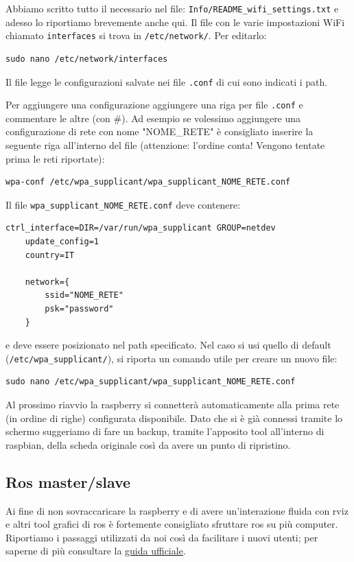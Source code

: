 Abbiamo scritto tutto il necessario nel file: \texttt{Info/README\_wifi\_settings.txt} e adesso lo riportiamo brevemente anche qui.
Il file con le varie impostazioni WiFi chiamato \texttt{interfaces} si trova in \texttt{/etc/network/}. Per editarlo:
\begin{lstlisting}[style=bash]
	sudo nano /etc/network/interfaces
\end{lstlisting}
Il file legge le configurazioni salvate nei file \texttt{.conf} di cui sono indicati i path. 

Per aggiungere una configurazione aggiungere una riga per file \texttt{.conf} e commentare le altre (con \#).
Ad esempio se volessimo aggiungere una configurazione di rete con nome "NOME\_RETE" \`e consigliato inserire la seguente riga all'interno del file (attenzione: l'ordine conta! Vengono tentate prima le reti riportate):
\begin{lstlisting}[style=xml]
	wpa-conf /etc/wpa_supplicant/wpa_supplicant_NOME_RETE.conf
\end{lstlisting}
Il file \verb|wpa_supplicant_NOME_RETE.conf| deve contenere:
\begin{lstlisting}[style=xml]
	ctrl_interface=DIR=/var/run/wpa_supplicant GROUP=netdev
	update_config=1
	country=IT

	network={
		ssid="NOME_RETE"
		psk="password"
	}
\end{lstlisting}
e deve essere posizionato nel path specificato. 
Nel caso si usi quello di default (\texttt{/etc/wpa\_supplicant/}), si riporta un comando utile per creare un nuovo file:
\begin{lstlisting}[style=bash]
	sudo nano /etc/wpa_supplicant/wpa_supplicant_NOME_RETE.conf
\end{lstlisting}

Al prossimo riavvio la raspberry si connetter\`a automaticamente alla prima rete (in ordine di righe) configurata disponibile. 
Dato che si \`e gi\`a connessi tramite lo schermo suggeriamo di fare un backup, tramite l'apposito tool all'interno di raspbian, della scheda originale cos\`i da avere un punto di ripristino. 

\subsection{Ros master/slave}
\label{sez: Ros master/slave}
Ai fine di non sovraccaricare la raspberry e di avere un'interazione fluida con rviz e altri tool grafici di ros \`e fortemente consigliato sfruttare ros su pi\`u computer. 
Riportiamo i passaggi utilizzati da noi cos\`i  da facilitare i nuovi utenti; per saperne di pi\`u consultare la \href{https://wiki.ros.org/ROS/Tutorials/MultipleMachines}{guida ufficiale}. 

